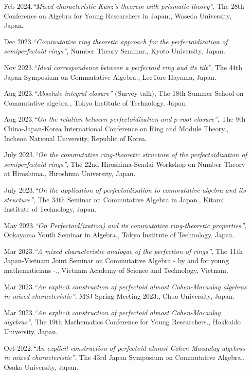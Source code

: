 \documentclass[10pt,a4paper,sans]{moderncv}
\begin{document}
\begin{etaremune}
  \item Feb 2024.\emph{``Mixed characteristic Kunz's theorem with prismatic theory''}, \textsf{The 28th Conference on Algebra for Young Researchers in Japan.}, Waseda University, Japan.
  \item Dec 2023.\emph{``Commutative ring theoretic approach for the perfectoidization of semiperfectoid rings''}, \textsf{Number Theory Seminar.}, Kyoto University, Japan.
  \item Nov 2023.\emph{``Ideal correspondence between a perfectoid ring and its tilt''}, \textsf{The 44th Japan Symposium on Commutative Algebra.}, LecTore Hayama, Japan.
  \item Aug 2023.\emph{``Absolute integral closure''} (Survey talk), \textsf{The 18th Summer School on Commutative algebra.}, Tokyo Institute of Technology, Japan.
  \item Aug 2023.\emph{``On the relation between perfectoidization and \(p\)-root closure''}, \textsf{The 9th China-Japan-Korea International Conference on Ring and Module Theory.}, Incheon National University, Republic of Korea.
  \item July 2023.\emph{``On the commutative ring-theoretic structure of the perfectoidization of semiperfectoid rings''}, \textsf{The 22nd Hiroshima-Sendai Workshop on Number Theory at Hiroshima.}, Hiroshima University, Japan.
  \item July 2023.\emph{``On the application of perfectoidization to commutative algebra and its structure''}, \textsf{The 34th Seminar on Commutative Algebra in Japan.}, Kitami Institute of Technology, Japan.
  \item May 2023.\emph{``On Perfectoid(ization) and its commutative ring-theoretic properties''}, \textsf{Ookayama Youth Seminar in Algebra.}, Tokyo Institute of Technology, Japan.
  \item Mar 2023.\emph{``A mixed characteristic analogue of the perfection of rings''}, \textsf{The 11th Japan-Vietnam Joint Seminar on Commutative Algebra - by and for young mathematicians -.}, Vietnam Academy of Science and Technology, Vietnam.
  \item Mar 2023.\emph{``An explicit construction of perfectoid almost Cohen-Macaulay algebras in mixed characteristic''}, \textsf{MSJ Spring Meeting 2023.}, Chuo University, Japan.
  \item Mar 2023.\emph{``An explicit construction of perfectoid almost Cohen-Macaulay algebras''}, \textsf{The 19th Mathematics Conference for Young Researchers.}, Hokkaido University, Japan.
  \item Oct 2022.\emph{``An explicit construction of perfectoid almost Cohen-Macaulay algebras in mixed characteristic''}, \textsf{The 43rd Japan Symposium on Commutative Algebra.}, Osaka University, Japan.
\end{etaremune}
\end{document}
